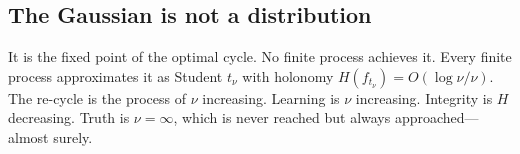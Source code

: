 \subsection*{The Gaussian is not a distribution}

It is the fixed point of the optimal cycle. No finite process achieves it. Every finite process approximates it as Student $t_\nu$ with holonomy $H(f_{t_\nu}) = O(\log\nu/\nu)$. The re-cycle is the process of $\nu$ increasing. Learning is $\nu$ increasing. Integrity is $H$ decreasing. Truth is $\nu = \infty$, which is never reached but always approached---almost surely.

